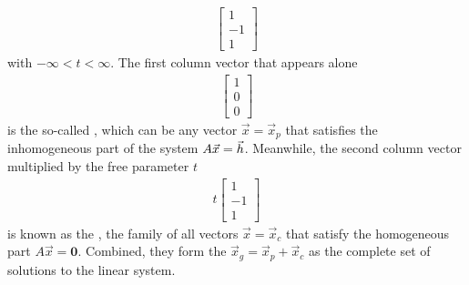\begin{solution}
\begin{align*}
\begin{bmatrix}
1 \\
-1 \\
1
\end{bmatrix}
\end{align*}
with $-\infty < t < \infty$. The first column vector that appears alone
\begin{align*}
\begin{bmatrix}
1 \\
0 \\
0
\end{bmatrix}    
\end{align*}
is the so-called , which can be any vector $\vec{x} = \vec{x}_p$ that satisfies the inhomogeneous part of the system $A\vec{x} = \smash{\vec{h}}$. Meanwhile, the second column vector multiplied by the free parameter $t$
\begin{align*}
t
\begin{bmatrix}
1 \\
-1 \\
1
\end{bmatrix}    
\end{align*}
is known as the , the family of all vectors $\vec{x} = \vec{x}_c$ that satisfy the homogeneous part $A\vec{x} = \textbf{0}$. Combined, they form the  $\vec{x}_g = \vec{x}_p + \vec{x}_c$ as the complete set of solutions to the linear system. 
\end{solution}
